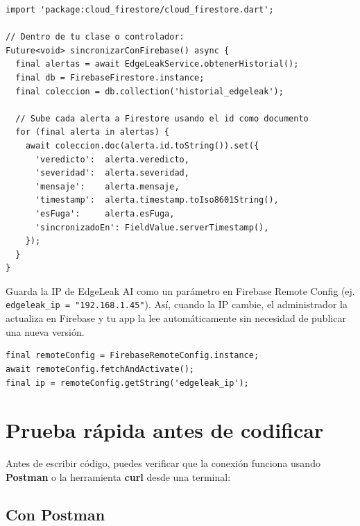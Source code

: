 \documentclass[12pt, a4paper]{article}
\begin{document}
\begin{lstlisting}[style=dartStyle, caption={Sincronización con Firebase Firestore}]
import 'package:cloud_firestore/cloud_firestore.dart';

// Dentro de tu clase o controlador:
Future<void> sincronizarConFirebase() async {
  final alertas = await EdgeLeakService.obtenerHistorial();
  final db = FirebaseFirestore.instance;
  final coleccion = db.collection('historial_edgeleak');

  // Sube cada alerta a Firestore usando el id como documento
  for (final alerta in alertas) {
    await coleccion.doc(alerta.id.toString()).set({
      'veredicto':  alerta.veredicto,
      'severidad':  alerta.severidad,
      'mensaje':    alerta.mensaje,
      'timestamp':  alerta.timestamp.toIso8601String(),
      'esFuga':     alerta.esFuga,
      'sincronizadoEn': FieldValue.serverTimestamp(),
    });
  }
}
\end{lstlisting}

\begin{tcolorbox}[infobox, title={\faLightbulb\ Tip — IP dinámica con Firebase Remote Config}]
  Guarda la IP de EdgeLeak AI como un parámetro en Firebase Remote Config
  (ej. \texttt{edgeleak\_ip = "192.168.1.45"}). Así, cuando la IP cambie, el
  administrador la actualiza en Firebase y tu app la lee automáticamente sin
  necesidad de publicar una nueva versión.

  \begin{lstlisting}[style=dartStyle]
final remoteConfig = FirebaseRemoteConfig.instance;
await remoteConfig.fetchAndActivate();
final ip = remoteConfig.getString('edgeleak_ip');
  \end{lstlisting}
\end{tcolorbox}

\section{Prueba rápida antes de codificar}

Antes de escribir código, puedes verificar que la conexión funciona usando
\textbf{Postman} o la herramienta \textbf{curl} desde una terminal:

\subsection{Con Postman}
\end{document}
